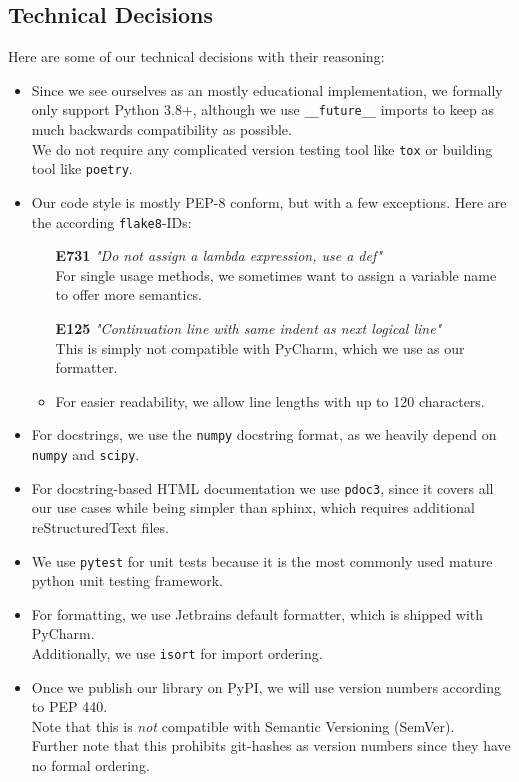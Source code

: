 \subsection{Technical Decisions}
Here are some of our technical decisions with their reasoning:
\begin{itemize}
    \item Since we see ourselves as an mostly educational implementation, we formally only support Python 3.8+, although we use \texttt{\_\_future\_\_} imports to keep as much backwards compatibility as possible.\\
    We do not require any complicated version testing tool like \texttt{tox} or building tool like \texttt{poetry}.
    \item Our code style is mostly PEP-8 conform, but with a few exceptions. Here are the according \texttt{flake8}-IDs:
    \begin{itemize}
        \item[\textbf{E731}] \textit{"Do not assign a lambda expression, use a def"}\\
        For single usage methods, we sometimes want to assign a variable name to offer more semantics.
        \item[\textbf{E125}] \textit{"Continuation line with same indent as next logical line"}\\
        This is simply not compatible with PyCharm, which we use as our formatter.
        \item For easier readability, we allow line lengths with up to 120 characters.
    \end{itemize}
    \item For docstrings, we use the \texttt{numpy} docstring format, as we heavily depend on \texttt{numpy} and \texttt{scipy}.
    \item For docstring-based HTML documentation we use \texttt{pdoc3}, since it covers all our use cases while being simpler than sphinx, which requires additional reStructuredText files.
    \item We use \texttt{pytest} for unit tests because it is the most commonly used mature python unit testing framework.
    \item For formatting, we use Jetbrains default formatter, which is shipped with PyCharm.\\
    Additionally, we use \texttt{isort} for import ordering.
    \item Once we publish our library on PyPI, we will use version numbers according to PEP 440.\\
    Note that this is \textit{not} compatible with Semantic Versioning (SemVer).\\
    Further note that this prohibits git-hashes as version numbers since they have no formal ordering.
\end{itemize}
